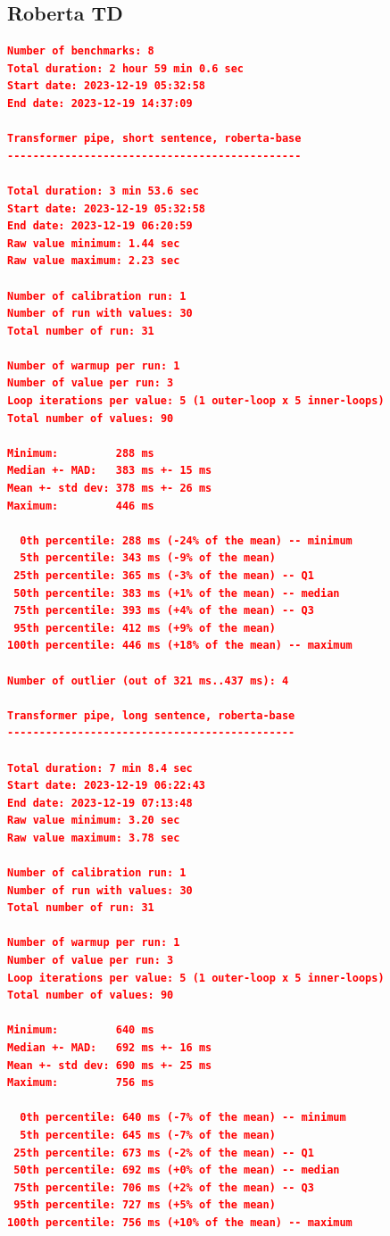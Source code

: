 \subsection{Roberta TD}
\begin{lstlisting}[language=json]
Number of benchmarks: 8
Total duration: 2 hour 59 min 0.6 sec
Start date: 2023-12-19 05:32:58
End date: 2023-12-19 14:37:09

Transformer pipe, short sentence, roberta-base
----------------------------------------------

Total duration: 3 min 53.6 sec
Start date: 2023-12-19 05:32:58
End date: 2023-12-19 06:20:59
Raw value minimum: 1.44 sec
Raw value maximum: 2.23 sec

Number of calibration run: 1
Number of run with values: 30
Total number of run: 31

Number of warmup per run: 1
Number of value per run: 3
Loop iterations per value: 5 (1 outer-loop x 5 inner-loops)
Total number of values: 90

Minimum:         288 ms
Median +- MAD:   383 ms +- 15 ms
Mean +- std dev: 378 ms +- 26 ms
Maximum:         446 ms

  0th percentile: 288 ms (-24% of the mean) -- minimum
  5th percentile: 343 ms (-9% of the mean)
 25th percentile: 365 ms (-3% of the mean) -- Q1
 50th percentile: 383 ms (+1% of the mean) -- median
 75th percentile: 393 ms (+4% of the mean) -- Q3
 95th percentile: 412 ms (+9% of the mean)
100th percentile: 446 ms (+18% of the mean) -- maximum

Number of outlier (out of 321 ms..437 ms): 4

Transformer pipe, long sentence, roberta-base
---------------------------------------------

Total duration: 7 min 8.4 sec
Start date: 2023-12-19 06:22:43
End date: 2023-12-19 07:13:48
Raw value minimum: 3.20 sec
Raw value maximum: 3.78 sec

Number of calibration run: 1
Number of run with values: 30
Total number of run: 31

Number of warmup per run: 1
Number of value per run: 3
Loop iterations per value: 5 (1 outer-loop x 5 inner-loops)
Total number of values: 90

Minimum:         640 ms
Median +- MAD:   692 ms +- 16 ms
Mean +- std dev: 690 ms +- 25 ms
Maximum:         756 ms

  0th percentile: 640 ms (-7% of the mean) -- minimum
  5th percentile: 645 ms (-7% of the mean)
 25th percentile: 673 ms (-2% of the mean) -- Q1
 50th percentile: 692 ms (+0% of the mean) -- median
 75th percentile: 706 ms (+2% of the mean) -- Q3
 95th percentile: 727 ms (+5% of the mean)
100th percentile: 756 ms (+10% of the mean) -- maximum


\end{lstlisting}
